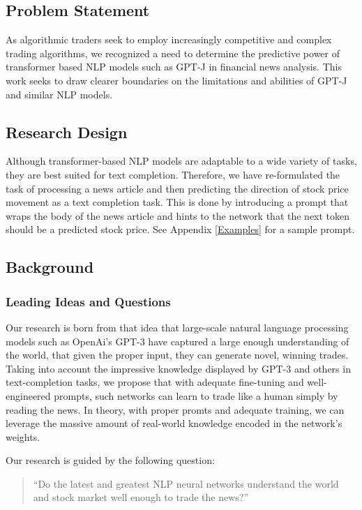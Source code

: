 \documentclass[conference]{IEEEtran}
\begin{document}
\subsection{Problem Statement}
As algorithmic traders seek to employ increasingly competitive and complex trading algorithms, we recognized a need to determine the predictive power of transformer based NLP models such as GPT-J\cite{mesh-transformer-jax} in financial news analysis. This work seeks to draw clearer boundaries on the limitations and abilities of GPT-J and similar NLP models.

\subsection{Research Design}
Although transformer-based NLP models are adaptable to a wide variety of tasks, they are best suited for text completion. Therefore, we have re-formulated the task of processing a news article and then predicting the direction of stock price movement as a text completion task. This is done by introducing a prompt that wraps the body of the news article and hints to the network that the next token should be a predicted stock price. See Appendix \ref{Examples} for a sample prompt.

\subsection{Background}
\subsubsection{Leading Ideas and Questions}
Our research is born from that idea that large-scale natural language processing models such as OpenAi's GPT-3 \cite{Brown2020} have captured a large enough understanding of the world, that given the proper input, they can generate novel, winning trades. Taking into account the impressive knowledge displayed by GPT-3 and others in text-completion tasks, we propose that with adequate fine-tuning and well-engineered prompts, such networks can learn to trade like a human simply by reading the news. In theory, with proper promts and adequate training, we can leverage the massive amount of real-world knowledge encoded in the network's weights.

Our research is guided by the following question:
\begin{quote}
    ``Do the latest and greatest NLP neural networks understand the world and stock market well enough to trade the news?''
\end{quote}
\end{document}
